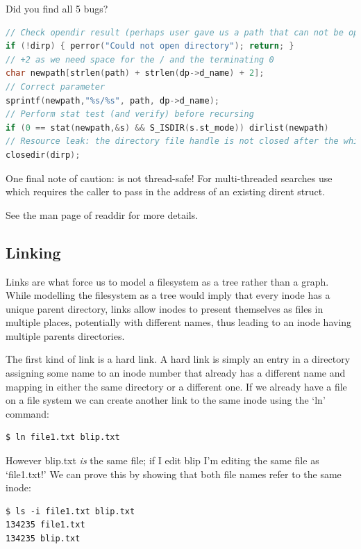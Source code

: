 Did you find all 5 bugs?

\begin{lstlisting}[language=C]
// Check opendir result (perhaps user gave us a path that can not be opened as a directory
if (!dirp) { perror("Could not open directory"); return; }
// +2 as we need space for the / and the terminating 0
char newpath[strlen(path) + strlen(dp->d_name) + 2];
// Correct parameter
sprintf(newpath,"%s/%s", path, dp->d_name);
// Perform stat test (and verify) before recursing
if (0 == stat(newpath,&s) && S_ISDIR(s.st_mode)) dirlist(newpath)
// Resource leak: the directory file handle is not closed after the while loop
closedir(dirp);
\end{lstlisting}

One final note of caution:  is not thread-safe! For multi-threaded searches use  which requires the caller to pass in the address of an existing dirent struct.

See the man page of readdir for more details.

\subsection{Linking}

Links are what force us to model a filesystem as a tree rather than a graph. While modelling the filesystem as a tree would imply that every inode has a unique parent directory, links allow inodes to present themselves as files in multiple places, potentially with different names, thus leading to an inode having multiple parents directories.

The first kind of link is a hard link. A hard link is simply an entry in a directory assigning some name to an inode number that already has a different name and mapping in either the same directory or a different one. If we already have a file on a file system we can create another link to the same inode using the `ln' command:

\begin{lstlisting}
$ ln file1.txt blip.txt
\end{lstlisting}

However blip.txt \emph{is} the same file; if I edit blip I'm editing the same file as `file1.txt!' We can prove this by showing that both file names refer to the same inode:

\begin{lstlisting}
$ ls -i file1.txt blip.txt
134235 file1.txt
134235 blip.txt
\end{lstlisting}

